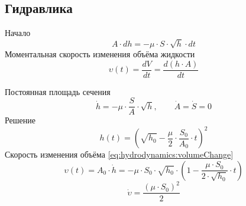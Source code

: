 \subsection{Гидравлика}

Начало
\begin{equation*}
  A \cdot dh = - \mu \cdot S \cdot \sqrt{h} \cdot dt
\end{equation*}
Моментальная скорость изменения объёма жидкости
\begin{equation}\label{eq:hydrodynamics:volumeChange}
  \upsilon\left( t \right)
  = \frac{dV}{dt} = \frac{d\left( h \cdot A \right)}{dt}
\end{equation}

Постоянная площадь сечения
\begin{equation*}
  \dot{h}
  = - \mu \cdot \frac{S}{A} \cdot \sqrt{h},
  \qquad  \dot{A} = \dot{S} = 0
\end{equation*}
Решение
\begin{equation*}
  h\left( t \right)
  = \left( \sqrt{h_0}
    - \frac{\mu}{2} \cdot \frac{S_0}{A_0} \cdot t \right)^2
\end{equation*}
Скорость изменения объёма \eqref{eq:hydrodynamics:volumeChange}
\begin{equation*}
  \upsilon\left( t \right)
  = A_0 \cdot \dot{h}
  = - \mu \cdot S_0 \cdot \sqrt{h_0}
    \cdot \left( 1 - \frac{\mu \cdot S_0}{2 \cdot \sqrt{h_0}} \cdot t \right)
\end{equation*}
\begin{equation*}
  \dot{\upsilon}
  = \frac{\left( \mu \cdot S_0 \right)^2}{2}
\end{equation*}

